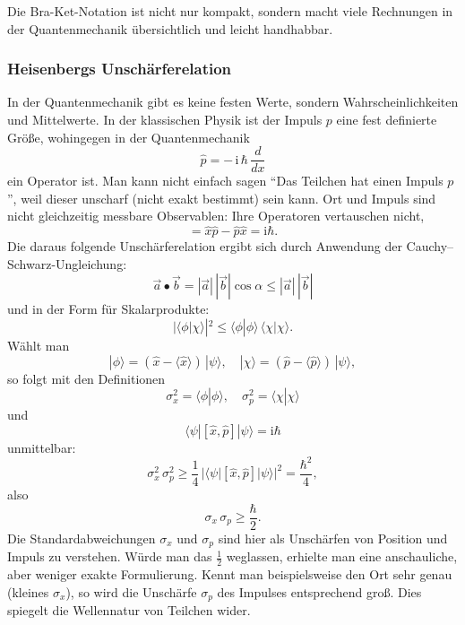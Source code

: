 Die Bra-Ket-Notation ist nicht nur kompakt, sondern macht viele Rechnungen in der Quantenmechanik übersichtlich und leicht handhabbar.

\subsubsection{Heisenbergs Unschärferelation%
\label{fourier:subsubsection:unschaerferelation}}
In der Quantenmechanik gibt es keine festen Werte, sondern Wahrscheinlichkeiten und Mittelwerte.
In der klassischen Physik ist der Impuls $p$ eine fest definierte Größe, wohingegen in der Quantenmechanik
\begin{equation}
\hat{p} = -\,\mathrm{i}\,\hbar\,\frac{d}{dx}
\end{equation}
ein Operator ist.
Man kann nicht einfach sagen ``Das Teilchen hat einen Impuls $p$'', weil dieser unscharf (nicht exakt bestimmt) sein kann.
Ort und Impuls sind nicht gleichzeitig messbare Observablen: Ihre Operatoren vertauschen nicht,
\begin{equation}
[\hat{x},\hat{p}] = \hat{x} \hat{p} - \hat{p} \hat{x} = \mathrm{i} \hbar.
\end{equation}
Die daraus folgende Unschärferelation ergibt sich durch Anwendung der Cauchy–Schwarz-Ungleichung:
\begin{equation}
\vec{a} \bullet \vec{b} = |\vec{a}|\,|\vec{b}|\cos\alpha \le |\vec{a}|\,|\vec{b}|
\end{equation}
und in der Form für Skalarprodukte:		%
\begin{equation}
|\langle \phi | \chi \rangle|^2 \le \langle \phi | \phi \rangle\,\langle \chi | \chi \rangle.
\end{equation}
Wählt man
\begin{equation}
|\phi\rangle = (\hat{x} - \langle \hat{x} \rangle)\,|\psi\rangle,
\quad
|\chi\rangle = (\hat{p} - \langle \hat{p} \rangle)\,|\psi\rangle,
\end{equation}
so folgt mit den Definitionen
\begin{equation}
\sigma_x^2 = \langle \phi | \phi \rangle,
\quad
\sigma_p^2 = \langle \chi | \chi \rangle
\end{equation}
und
\begin{equation}
\langle \psi | [\hat{x},\hat{p}] | \psi \rangle = \mathrm{i}\hbar
\end{equation}
unmittelbar:
\begin{equation}
\sigma_x^2\,\sigma_p^2 \ge \frac{1}{4}\,|\langle \psi | [\hat{x},\hat{p}] | \psi \rangle|^2
= \frac{\hbar^2}{4},
\end{equation}
also
\begin{equation}
\sigma_x\,\sigma_p \ge \frac{\hbar}{2}.
\end{equation}
Die Standardabweichungen $\sigma_x$ und $\sigma_p$ sind hier als Unschärfen von Position und Impuls zu verstehen.
Würde man das $\tfrac12$ weglassen, erhielte man eine anschauliche, aber weniger exakte Formulierung.
Kennt man beispielsweise den Ort sehr genau (kleines $\sigma_x$), so wird die Unschärfe $\sigma_p$ des Impulses entsprechend groß.
Dies spiegelt die Wellennatur von Teilchen wider.

